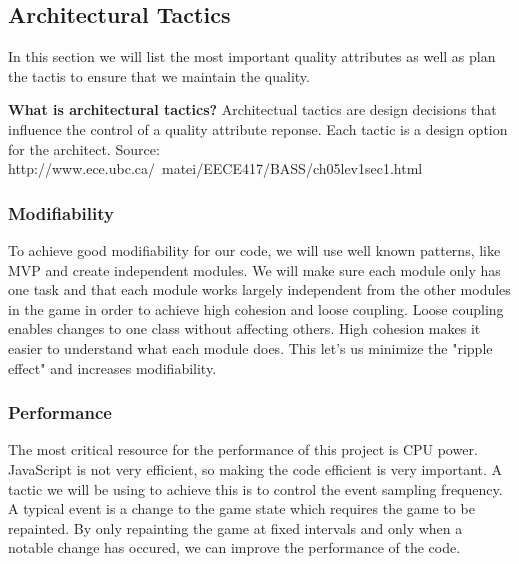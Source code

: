 \subsection{Architectural Tactics}
In this section we will list the most important quality attributes as well as plan the tactis to 
ensure that we maintain the quality.

{\bf What is architectural tactics? }
Architectual tactics are design decisions that influence the control of a quality attribute reponse. 
Each tactic is a design option for the architect. 
Source: http://www.ece.ubc.ca/~matei/EECE417/BASS/ch05lev1sec1.html

\subsubsection{Modifiability}
To achieve good modifiability for our code, we will use well known patterns, like MVP and create 
independent modules. We will make sure each module only has one task and that each module works 
largely independent from the other modules in the game in order to achieve high cohesion and loose 
coupling. Loose coupling enables changes to one class without affecting others. High cohesion makes 
it easier to understand what each module does. This let's us minimize the "ripple effect" and 
increases modifiability.

\subsubsection{Performance}
The most critical resource for the performance of this project is CPU power. JavaScript is not very 
efficient, so making the code efficient is very important. A tactic we will be using to achieve this 
is to control the event sampling frequency. A typical event is a change to the game state which 
requires the game to be repainted. By only repainting the game at fixed intervals and only when a 
notable change has occured, we can improve the performance of the code.